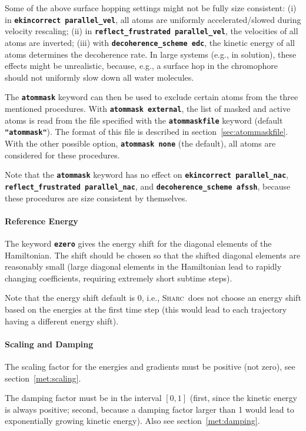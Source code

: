 \documentclass[a4paper,10pt,DIV=15,openany,twoside=false]{scrbook}
\newcommand{\sharc}{\textsc{Sharc}}
\newcommand{\ttt}[1]{\textbf{\texttt{#1}}}
\begin{document}
Some of the above surface hopping settings might not be fully size consistent: (i) in \ttt{ekincorrect parallel\_vel}, all atoms are uniformly accelerated/slowed during velocity rescaling; (ii) in \ttt{reflect\_frustrated parallel\_vel}, the velocities of all atoms are inverted; (iii) with \ttt{decoherence\_scheme edc}, the kinetic energy of all atoms determines the decoherence rate. In large systems (e.g., in solution), these effects might be unrealistic, because, e.g., a surface hop in the chromophore should not uniformly slow down all water molecules.

The \ttt{atommask} keyword can then be used to exclude certain atoms from the three mentioned procedures. With \ttt{atommask external}, the list of masked and active atoms is read from the file specified with the \ttt{atommaskfile} keyword (default \ttt{"atommask"}). The format of this file is described in section~\ref{sec:atommaskfile}. With the other possible option, \ttt{atommask none} (the default), all atoms are considered for these procedures.

Note that the \ttt{atommask} keyword has no effect on \ttt{ekincorrect parallel\_nac}, \ttt{reflect\_frustrated parallel\_nac}, and \ttt{decoherence\_scheme afssh}, because these procedures are size consistent by themselves.

\paragraph{Reference Energy}

The keyword \ttt{ezero} gives the energy shift for the diagonal elements of the Hamiltonian. The shift should be chosen so that the shifted diagonal elements are reasonably small (large diagonal elements in the Hamiltonian lead to rapidly changing coefficients, requiring extremely short subtime steps). 

Note that the energy shift default is 0, i.e., \sharc\ does not choose an energy shift based on the energies at the first time step (this would lead to each trajectory having a different energy shift).

\paragraph{Scaling and Damping}

The scaling factor for the energies and gradients must be positive (not zero), see section~\ref{met:scaling}.

The damping factor must be in the interval $[0,1]$ (first, since the kinetic energy is always positive; second, because a damping factor larger than 1 would lead to exponentially growing kinetic energy). Also see section~\ref{met:damping}.
\end{document}

